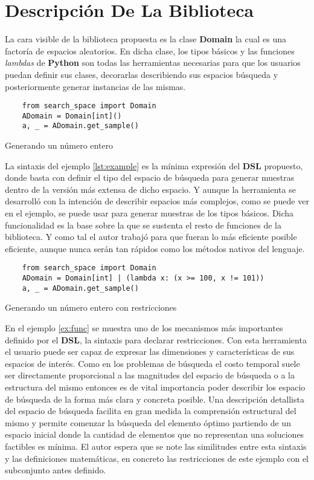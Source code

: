 \section{Descripción De La Biblioteca}\label{section:describe}

La cara visible de la biblioteca propuesta es la clase {\bf Domain} la cual es una factoría de espacios
aleatorios. En dicha clase, los tipos básicos y las funciones {\it lambdas} de {\bf Python} son todas
las herramientas necesarias para que los usuarios puedan definir sus clases, decorarlas describiendo
sus espacios búsqueda y posteriormente generar instancias de las mismas.


\begin{listing}[!ht]
    \begin{verbatim}
    from search_space import Domain
    ADomain = Domain[int]()
    a, _ = ADomain.get_sample()
    \end{verbatim}
    \caption{Generando un número entero}
    \label{lst:example}
\end{listing}

La sintaxis del ejemplo \ref{lst:example} es la mínima expresión del {\bf DSL} propuesto, donde basta con
definir el tipo del espacio de búsqueda para generar muestras dentro de la versión más extensa de dicho
espacio. Y aunque la herramienta se desarrolló con la intención de describir espacios más complejos,
como se puede ver en el ejemplo, se puede usar para generar muestras de los tipos básicos. Dicha
funcionalidad es la base sobre la que se sustenta el resto de funciones de la biblioteca.
Y como tal el autor trabajó para que fueran lo más eficiente posible eficiente, aunque nunca serán
tan rápidos como los métodos nativos del lenguaje.

\begin{listing}[!ht]
    \begin{verbatim}
    from search_space import Domain
    ADomain = Domain[int] | (lambda x: (x >= 100, x != 101))
    a, _ = ADomain.get_sample()
    \end{verbatim}
    \caption{Generando un número entero con restricciones}
    \label{ex:func}
\end{listing}


En el ejemplo \ref{ex:func} se muestra uno de los mecanismos más importantes definido por el
    {\bf DSL}, la sintaxis para declarar restricciones. Con esta herramienta el usuario puede ser capaz de
expresar las dimensiones y características de sus espacios de interés. Como en los problemas de búsqueda el
costo temporal suele ser directamente proporcional a las magnitudes del espacio de búsqueda o a la estructura
del mismo entonces es de vital importancia poder describir los espacio de búsqueda de la forma más clara y
concreta posible. Una descripción detallista del espacio de búsqueda facilita en gran medida la comprensión
estructural del mismo y permite comenzar la búsqueda del elemento óptimo partiendo de un espacio inicial donde
la cantidad de elementos que no representan una soluciones factibles es mínima. El autor espera que se note las
similitudes entre esta sintaxis y las definiciones matemáticas, en concreto las restricciones de este ejemplo
con el subconjunto antes definido.



